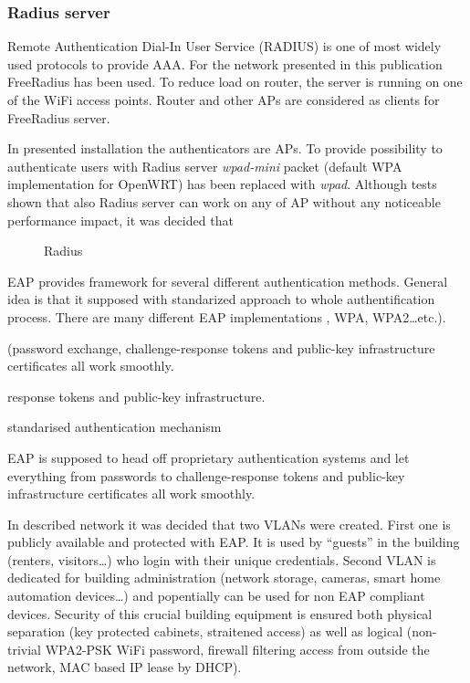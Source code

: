 \documentclass{llncs}
\begin{document}
\subsubsection{Radius server}

Remote Authentication Dial-In User Service (RADIUS) \cite{rfc2865} is one of most widely used protocols to provide AAA. For the network presented in this publication FreeRadius \cite{freeRadius} has been used. To reduce load on router, the server is running on one of the WiFi access points. Router and other
APs are considered as clients for FreeRadius server. 


In presented installation the authenticators are APs. To provide possibility to authenticate users with Radius server \textit{wpad-mini} packet (default WPA implementation for OpenWRT) has been replaced with \textit{wpad}. Although tests shown that also Radius server can work on any of AP without any noticeable performance impact, it was decided that   



\begin{figure}
	\vspace{-15pt}
	\caption{Radius}
\end{figure}



EAP provides framework for several different authentication methods. General
idea is that it supposed  with standarized
approach to whole authentification process. There are many different EAP
implementations , WPA, WPA2\ldots etc.).


 (password exchange,
challenge-response tokens and public-key infrastructure certificates all work smoothly.

 response tokens and public-key infrastructure.


standarised authentication mechanism

 EAP is supposed to head off
proprietary authentication systems and let everything from passwords to challenge-response tokens and public-key
infrastructure certificates all work smoothly.

In described network it was decided that two VLANs were created. First one is
publicly available and protected with EAP. It is used by ``guests'' in the building
(renters, visitors\ldots) who login with their unique credentials. Second VLAN
is dedicated for building administration (network storage, cameras, smart home
automation devices\ldots) and popentially can be used for non EAP compliant
devices. Security of this crucial building equipment is ensured both physical
separation (key protected cabinets, straitened access) as well as logical
(non-trivial WPA2-PSK WiFi password, firewall filtering access from outside the
network, MAC based IP lease by DHCP). 
\end{document}
